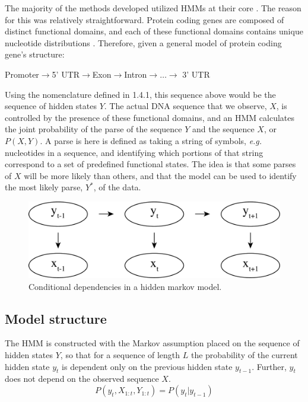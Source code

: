 The majority of the methods developed utilized HMMs at their core \cite{Burge1997PredictionDNA,Pachter2002ApplicationsProblems,Henderson1997FindingModel}. The reason for this was relatively straightforward. Protein coding genes are composed of distinct functional domains, and each of these functional domains contains unique nucleotide distributions \cite{Burge1997PredictionDNA,Pachter2002ApplicationsProblems,Henderson1997FindingModel}. Therefore, given a general model of protein coding gene's structure:

\begin{center}
    Promoter$\rightarrow$5' UTR$\rightarrow$Exon$\rightarrow$Intron$\rightarrow \dots \rightarrow$ 3' UTR
\end{center}

Using the nomenclature defined in 1.4.1, this sequence above would be the sequence of hidden states $Y$. The actual DNA sequence that we observe, $X$, is controlled by the presence of these functional domains, and an HMM calculates the joint probability of the parse of the sequence $Y$ and the sequence $X$, or $P(X,Y)$. A parse is here is defined as taking a string of symbols, \textit{e.g.} nucleotides in a sequence, and identifying which portions of that string correspond to a set of predefined functional states. The idea is that some parses of $X$ will be more likely than others, and that the model can be used to identify the most likely parse, $Y^*$, of the data. 
\begin{figure}[h]
\centering
\includegraphics[width=.75\textwidth]{images/hmm.pdf}
\caption{Conditional dependencies in a hidden markov model.}
\label{fig:HMM}
\end{figure}
\subsection{Model structure}
The HMM is constructed with the Markov assumption placed on the sequence of hidden states $Y$, so that for a sequence of length $L$ the probability of the current hidden state $y_t$ is dependent only on the previous hidden state $y_{t-1}$. Further, $y_t$ does not depend on the observed sequence $X$. 
\begin{equation}
    P(y_t,X_{1:t},Y_{1:t}) = P(y_t|y_{t-1})
\end{equation}

